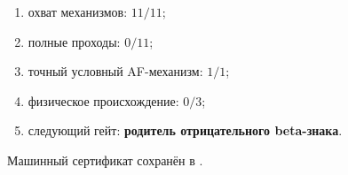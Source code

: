 \begin{protocol}\begin{enumerate}
\item охват механизмов: \textbf{$11/11$};
\item полные проходы: \textbf{$0/11$};
\item точный условный AF-механизм: \textbf{$1/1$};
\item физическое происхождение: \textbf{$0/3$};
\item следующий гейт: \textbf{родитель отрицательного beta-знака}.
\end{enumerate}\end{protocol}

Машинный сертификат сохранён в
.